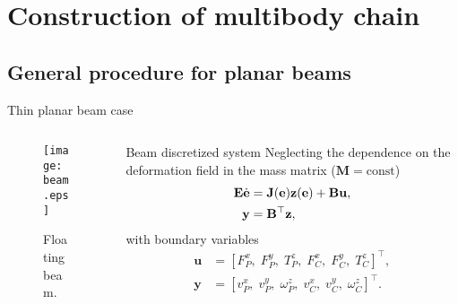 \documentclass[aspectratio=169]{ISAE-Beamer}
\begin{document}
\section{Construction of multibody chain}

\subsection{General procedure for planar beams}
\begin{frame}{Thin planar beam case}
	\begin{columns}[T]
		\begin{column}{0.5\columnwidth}
				\begin{tcolorbox}
				\begin{figure}
					\centering
					\texttt{[image: beam.eps]} 
					\caption{Floating beam.}
					\label{fig:beam}
				\end{figure}
			\end{tcolorbox}
		\end{column}
		\begin{column}{0.5\textwidth}
		\begin{block}{Beam discretized system}
			Neglecting the dependence on the deformation field in the mass matrix ($\mathbf{M}=\text{const}$)
			\begin{equation*}
			\begin{aligned}
			\mathbf{E} \dot{\mathbf{e}} &= \mathbf{J}(\mathbf{e}) \mathbf{z}(\mathbf{e}) + \mathbf{B} \mathbf{u}, \vspace{2mm} \\
			\mathbf{y} &= \mathbf{B}^{\top}  \mathbf{z}, \\
			\end{aligned}
			\end{equation*}
			with boundary variables
			\begin{equation*}
			\begin{aligned}
			\mathbf{u} &=  [F_{P}^x, \; F_{P}^y, \; T_{P}^z, \; F_{C}^x, \; F_{C}^y, \; T_{C}^z]^\top, \\
			\mathbf{y} &=  [v_{P}^x, \; v_{P}^y, \; \omega_{P}^z, \; v_{C}^x, \; v_{C}^y, \; \omega_{C}^z]^\top.
			\end{aligned}
			\end{equation*}
		\end{block}	
		\end{column}
	\end{columns}

\end{frame}
\end{document}
